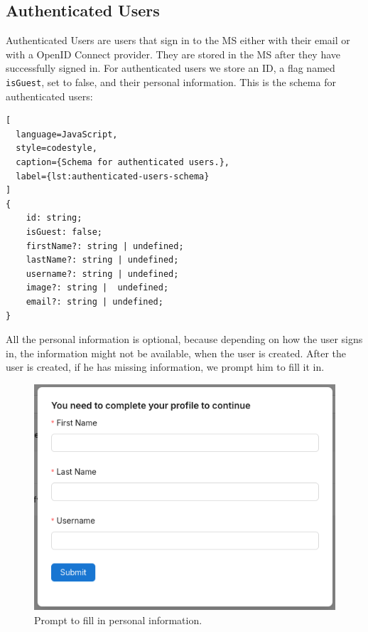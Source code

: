 \subsection{Authenticated Users}
\label{cha:ms-architecture:authenticated-users}

Authenticated Users are users that sign in to the MS either with their email or with a
OpenID Connect provider.
They are stored in the MS after they have successfully signed in.
For authenticated users we store an ID, a flag named \lstinline{isGuest}, set
to false, and their personal information.
This is the schema for authenticated users:


\begin{lstlisting}[
  language=JavaScript,
  style=codestyle,
  caption={Schema for authenticated users.},
  label={lst:authenticated-users-schema}
]
{
    id: string;
    isGuest: false;
    firstName?: string | undefined;
    lastName?: string | undefined;
    username?: string | undefined;
    image?: string |  undefined;
    email?: string | undefined;
}
\end{lstlisting}

All the personal information is optional, because depending on how the user signs in, the
information might not be available, when the user is created.
After the user is created, if he has missing information, we prompt him to fill it in.

\begin{figure}[H]
	\centering
	\includegraphics[scale=0.4]{images/fill-data-prompt.png}
	\caption{Prompt to fill in personal information.}
	\vspace{-1em} %
	\label{fig:prompt-fill-personal-information}
\end{figure}

